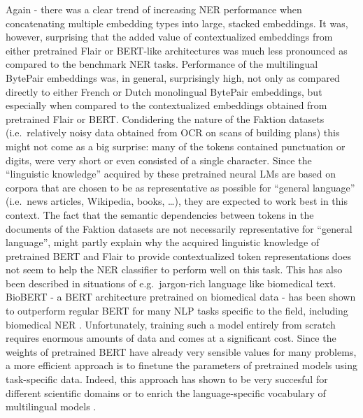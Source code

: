 \documentclass[12pt,a4paper,]{book}
\begin{document}
Again - there was a clear trend of increasing NER performance when concatenating multiple embedding types into large, stacked embeddings. It was, however, surprising that the added value of contextualized embeddings from either pretrained Flair or BERT-like architectures was much less pronounced as compared to the benchmark NER tasks. Performance of the multilingual BytePair embeddings was, in general, surprisingly high, not only as compared directly to either French or Dutch monolingual BytePair embeddings, but especially when compared to the contextualized embeddings obtained from pretrained Flair or BERT. Condidering the nature of the Faktion datasets (i.e.~relatively noisy data obtained from OCR on scans of building plans) this might not come as a big surprise: many of the tokens contained punctuation or digits, were very short or even consisted of a single character. Since the ``linguistic knowledge'' acquired by these pretrained neural LMs are based on corpora that are chosen to be as representative as possible for ``general language'' (i.e.~news articles, Wikipedia, books, \ldots{}), they are expected to work best in this context. The fact that the semantic dependencies between tokens in the documents of the Faktion datasets are not necessarily representative for ``general language'', might partly explain why the acquired linguistic knowledge of pretrained BERT and Flair to provide contextualized token representations does not seem to help the NER classifier to perform well on this task. This has also been described in situations of e.g.~jargon-rich language like biomedical text. BioBERT - a BERT architecture pretrained on biomedical data - has been shown to outperform regular BERT for many NLP tasks specific to the field, including biomedical NER \citep{lee2020}. Unfortunately, training such a model entirely from scratch requires enormous amounts of data and comes at a significant cost. Since the weights of pretrained BERT have already very sensible values for many problems, a more efficient approach is to finetune the parameters of pretrained models using task-specific data. Indeed, this approach has shown to be very succesful for different scientific domains \citep{beltagy2019} or to enrich the language-specific vocabulary of multilingual models \citep{wang2019}.
\end{document}
